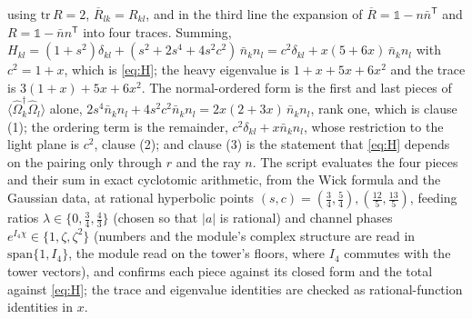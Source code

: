 using $\mathrm{tr}\,R = 2$, $\overline{R}_{lk} = R_{kl}$, and in the third line the expansion of $\overline{R} = \mathbb{1} - n\bar{n}^{\mathsf{T}}$ and $R = \mathbb{1} - \bar{n}n^{\mathsf{T}}$ into four traces. Summing, $H_{kl} = (1 + s^{2})\delta_{kl} + (s^{2} + 2s^{4} + 4s^{2}c^{2})\,\bar{n}_{k}n_{l} = c^{2}\delta_{kl} + x(5 + 6x)\,\bar{n}_{k}n_{l}$ with $c^{2} = 1 + x$, which is \eqref{eq:H}; the heavy eigenvalue is $1 + x + 5x + 6x^{2}$ and the trace is $3(1+x) + 5x + 6x^{2}$. The normal-ordered form is the first and last pieces of $\langle\hat\Omega_{k}^{\dagger}\hat\Omega_{l}\rangle$ alone, $2s^{4}\bar{n}_{k}n_{l} + 4s^{2}c^{2}\bar{n}_{k}n_{l} = 2x(2+3x)\,\bar{n}_{k}n_{l}$, rank one, which is clause (1); the ordering term is the remainder, $c^{2}\delta_{kl} + x\bar{n}_{k}n_{l}$, whose restriction to the light plane is $c^{2}$, clause (2); and clause (3) is the statement that \eqref{eq:H} depends on the pairing only through $r$ and the ray $n$. The script evaluates the four pieces and their sum in exact cyclotomic arithmetic, from the Wick formula and the Gaussian data, at rational hyperbolic points $(s, c) = (\tfrac34, \tfrac54), (\tfrac{12}{5}, \tfrac{13}{5})$, feeding ratios $\lambda \in \{0, \tfrac34, \tfrac43\}$ (chosen so that $|a|$ is rational) and channel phases $e^{I_4\chi} \in \{1, \zeta, \zeta^{2}\}$ (numbers and the module's complex structure are read in $\mathrm{span}\{1, I_4\}$, the module read on the tower's floors, where $I_4$ commutes with the tower vectors), and confirms each piece against its closed form and the total against \eqref{eq:H}; the trace and eigenvalue identities are checked as rational-function identities in $x$.
